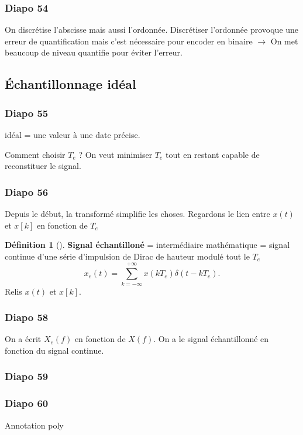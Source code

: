 \documentclass{article}
\theoremstyle{plain}%
\theoremstyle{definition}
\newtheorem{defn}{Définition}[section]
\theoremstyle{remark}
\begin{document}
\subsubsection{Diapo 54}
On discrétise l'abscisse mais aussi l'ordonnée. Discrétiser l'ordonnée provoque une erreur de quantification mais c'est nécessaire pour encoder en binaire $\rightarrow$ On met beaucoup de niveau quantifie pour éviter l'erreur.

\subsection{Échantillonnage idéal}
\subsubsection{Diapo 55}

idéal = une valeur à une date précise.

Comment choisir $ T_e $ ? On veut minimiser $ T_e $ tout en restant capable de reconstituer le signal. 

\subsubsection{Diapo 56}
Depuis le début, la transformé simplifie les choses. Regardons le lien entre $ x(t) $ et $ x[k] $ en fonction de $ T_e $ 
\begin{defn}[]
    \textbf{Signal échantilloné} = intermédiaire mathématique = signal continue d'une série d'impulsion de Dirac de hauteur modulé tout le $ T_e $ 
    \[
        x_e(t) = \sum_{k=-\infty }^{+\infty }x(kT_e)\delta (t-kT_e)
    .\]
    Relis $ x(t) $ et $ x[k] $.
\end{defn}

\subsubsection{Diapo 58}
On a écrit $ X_e(f) $ en fonction de $ X(f) $. On a le signal échantillonné en fonction du signal continue.

\subsubsection{Diapo 59}

\subsubsection{Diapo 60}
Annotation poly
\end{document}
